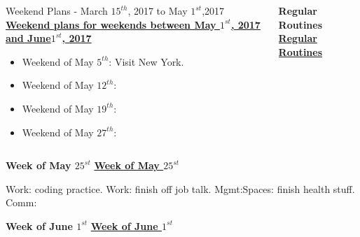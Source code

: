 \begin{columns}
\begin{column}{0.333\columnwidth}
\begin{columns}
\begin{column}{0.5\columnwidth}
\begin{block}{Weekend Plans - March $15^{th}$, 2017 to May $1^{st}$,2017}
{\underline{\bf  Weekend plans for weekends between May $1^{st}$, 2017
    and June$1^{st}$, 2017}}\\
\begin{itemize}
\item \tiny Weekend of May $5^{th}$: Visit New York.
\item \tiny Weekend of May $12^{th}$:
\item \tiny Weekend of May $19^{th}$:
\item \tiny Weekend of May $27^{th}$:
\end{itemize}

\ifdefined\POSTER
\end{block}
\end{column}
\fi


\ifdefined\POSTER
\begin{column}{0.28\linewidth}
\begin{block}{\small \bf Regular Routines}
\else
\underline{\bf Regular Routines}\\ 
\fi 

%


\ifdefined\POSTER
\end{block}
\end{column}%
\fi

\ifdefined\POSTER
\end{columns}
\fi
\begin{columns}
\begin{column}{0.5\columnwidth}
\ifdefined\POSTER
\begin{block}{\small \bf Week of May $25^{st}$}
  \else  
\underline{\bf Week of May $25^{st}$}\\ 
\fi 
\begin{framed}
\begin{enumerate} 
\mpitem Work: coding practice. 
\mpitem Work: finish off job talk. 
\mpitem Mgmt:Spaces: finish health stuff. 
\mpitem Comm: 
\end{enumerate}
\end{framed}

\ifdefined\POSTER
\end{block}
\fi

\ifdefined\POSTER
\begin{block}{\small \bf Week of June $1^{st}$}
\else
\underline{\bf Week of June $1^{st}$}\\
\fi


\end{block}
\end{column}
\end{columns}
\end{column}
\end{columns}
